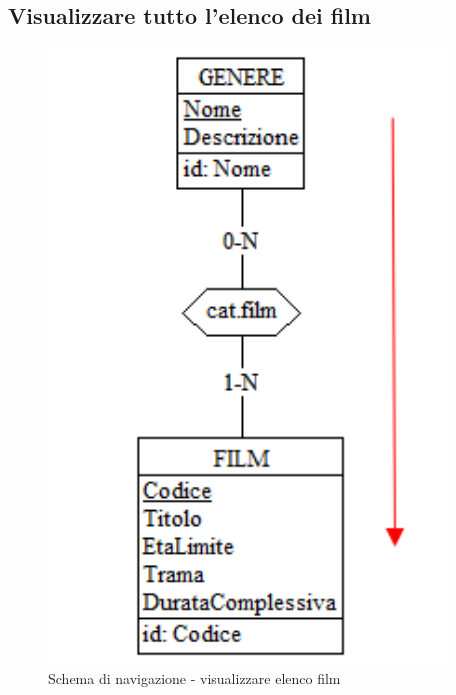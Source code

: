 \documentclass[a4paper,12pt]{report}
\begin{document}
	\subsection{Visualizzare tutto l'elenco dei film}
	\begin{figure}[H]
		\centering
		\includegraphics[width=300pt]{ER/navigazione/visualizzarefilm.png}
		\caption{Schema di navigazione - visualizzare elenco film}
	\end{figure}
	
\end{document}
